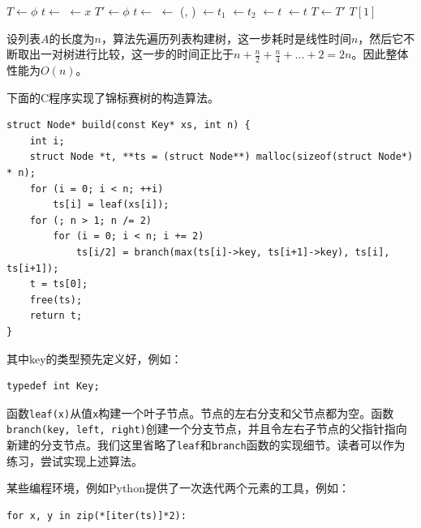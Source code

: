 \documentclass[b5paper]{ctexart}
\begin{document}
\begin{algorithmic}[1]
  \State $T \gets \phi$
    \State $t \gets $ 
    \State {} $\gets x$
    \State {}
  \EndFor
    \State $T' \gets \phi$
      \State $t \gets $ 
      \State {} $\gets$ (, )
      \State {} $\gets t_1$
      \State {} $\gets t_2$
      \State {} $\gets t$
      \State {} $\gets t$
      \State {}
    \EndFor
    \State $T \gets T'$
  \EndWhile
  \State \Return $T[1]$
\EndFunction
\end{algorithmic}

设列表$A$的长度为$n$，算法先遍历列表构建树，这一步耗时是线性时间$n$，然后它不断取出一对树进行比较，这一步的时间正比于$n + \frac{n}{2} + \frac{n}{4} + ... + 2 = 2n$。因此整体性能为$O(n)$。

下面的C程序实现了锦标赛树的构造算法。

\lstset{language=C}
\begin{lstlisting}
struct Node* build(const Key* xs, int n) {
    int i;
    struct Node *t, **ts = (struct Node**) malloc(sizeof(struct Node*) * n);
    for (i = 0; i < n; ++i)
        ts[i] = leaf(xs[i]);
    for (; n > 1; n /= 2)
        for (i = 0; i < n; i += 2)
            ts[i/2] = branch(max(ts[i]->key, ts[i+1]->key), ts[i], ts[i+1]);
    t = ts[0];
    free(ts);
    return t;
}
\end{lstlisting}

其中key的类型预先定义好，例如：

\lstset{language=C}
\begin{lstlisting}
typedef int Key;
\end{lstlisting}

函数\texttt{leaf(x)}从值\texttt{x}构建一个叶子节点。节点的左右分支和父节点都为空。函数\texttt{branch(key, left, right)}创建一个分支节点，并且令左右子节点的父指针指向新建的分支节点。我们这里省略了\texttt{leaf}和\texttt{branch}函数的实现细节。读者可以作为练习，尝试实现上述算法。

某些编程环境，例如Python提供了一次迭代两个元素的工具，例如：

\lstset{language=Python}
\begin{lstlisting}
for x, y in zip(*[iter(ts)]*2):
\end{lstlisting}
\end{document}
